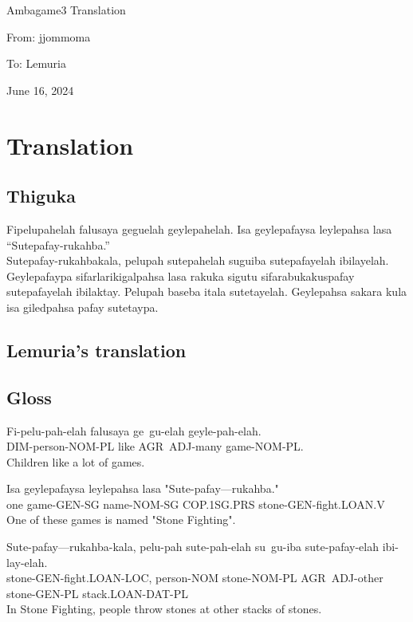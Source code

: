 \documentclass{thiguka}
\begin{document}
Ambagame3 Translation

From: jjommoma

To: Lemuria

June 16, 2024

\section{Translation}
\subsection{Thiguka}
Fipelupahelah falusaya geguelah geylepahelah.
Isa geylepafaysa leylepahsa lasa “Sutepafay-rukahba.”\\
Sutepafay-rukahbakala, pelupah sutepahelah suguiba sutepafayelah ibilayelah.
Geylepafaypa sifarlarikigalpahsa lasa rakuka sigutu sifarabukakuspafay sutepafayelah ibilaktay.
Pelupah baseba itala sutetayelah.
Geylepahsa sakara kula isa giledpahsa pafay sutetaypa.

\subsection{Lemuria's translation}

\subsection{Gloss}

\begin{exe}
\ex{} \gll{}Fi-pelu-pah-elah falusaya ge~gu-elah geyle-pah-elah.\\
            DIM-person-NOM-PL like AGR~ADJ-many game-NOM-PL.\\
      \glt{}Children like a lot of games.
\end{exe}

\begin{exe}
\ex{} \gll{}Isa geylepafaysa leylepahsa lasa "Sute-pafay---rukahba."\\
            one game-GEN-SG name-NOM-SG COP.1SG.PRS stone-GEN-fight.LOAN.V\\
      \glt{}One of these games is named "Stone Fighting".
\end{exe}

\begin{exe}
\ex{} \gll{}Sute-pafay---rukahba-kala, pelu-pah sute-pah-elah su~gu-iba sute-pafay-elah ibi-lay-elah.\\
            stone-GEN-fight.LOAN-LOC, person-NOM stone-NOM-PL AGR~ADJ-other stone-GEN-PL stack.LOAN-DAT-PL\\
      \glt{}In Stone Fighting, people throw stones at other stacks of stones.
\end{exe}
\end{document}
